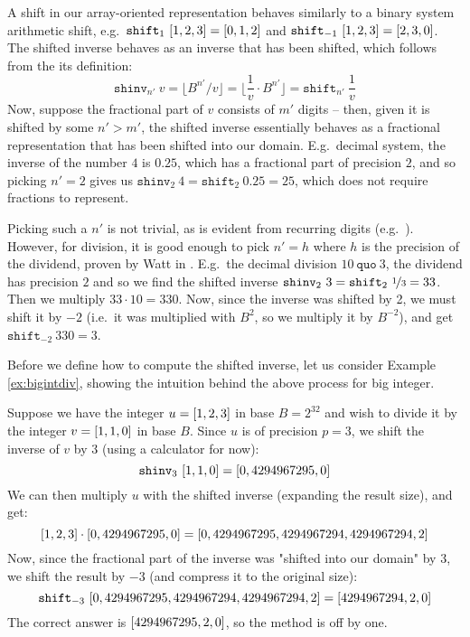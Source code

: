 A shift in our array-oriented representation behaves similarly to a binary
system arithmetic shift, e.g.\ $\mathtt{shift}_1~\mathtt{[}1,2,3\mathtt{]} = \mathtt{[}0,1,2\mathtt{]}$ and
$\mathtt{shift}_{-1}~\mathtt{[}1,2,3\mathtt{]} = \mathtt{[}2,3,0\mathtt{]}$. The shifted inverse behaves as
an inverse that has been shifted, which follows from the its definition:
\begin{equation}
\label{eq:shiftinvex}
\mathtt{shinv}_{n'}~v = \lfloor B^{n'}/ v \rfloor = \lfloor \dfrac{1}{v} \cdot B^{n'} \rfloor = \mathtt{shift}_{n'}~\dfrac{1}{v}
\end{equation}
Now, suppose the fractional part of $v$ consists of $m'$ digits -- then, given it
is shifted by some $n'>m'$, the shifted inverse essentially behaves as a
fractional representation that has been shifted into our domain. E.g.\ decimal
system, the inverse of the number $4$ is $0.25$, which has a fractional part of
precision $2$, and so picking $n'=2$ gives us
$\mathtt{shinv}_2~4 = \mathtt{shift}_2~0.25 = 25$, which does not require
fractions to represent.

Picking such a $n'$ is not trivial, as is evident from recurring digits (e.g.\
). However, for division, it is good enough to pick $n'=h$ where
$h$ is the precision of the dividend, proven by Watt in
\cite{watt2023efficient}. E.g.\ the decimal division $10~ \mathtt{quo}~3$, the
dividend has precision $2$ and so we find the shifted inverse
$\mathtt{shinv}_2~3= \mathtt{shift}_2~\nicefrac{1}{3} = 33$. Then we multiply
$33\cdot10 = 330$. Now, since the inverse was shifted by 2, we must shift it by
$-2$ (i.e.\ it was multiplied with $B^2$, so we multiply it by $B^{-2}$), and
get $\mathtt{shift}_{-2}~330 = 3$.

Before we define how to compute the shifted inverse, let us consider Example
\ref{ex:bigintdiv}, showing the intuition behind the above process for big
integer.\bigskip

\begin{example}\label{ex:bigintdiv}
  Suppose we have the integer $u=\mathtt{[}1,2,3\mathtt{]}$ in base $B=2^{32}$ and wish to
  divide it by the integer $v=\mathtt{[}1,1,0\mathtt{]}$ in base $B$. Since $u$ is of
  precision $p=3$, we shift the inverse of $v$ by $3$ (using a calculator for
  now):
\begin{equation}
\label{eq:3}
\mathtt{shinv}_3~\mathtt{[}1,1,0\mathtt{]} = \mathtt{[}0,4294967295,0\mathtt{]}
\end{equation}
We can then multiply $u$ with the shifted inverse (expanding the result size),
and get:
\begin{equation}
  \label{eq:4}
  \mathtt{[}1,2,3\mathtt{]}\cdot\mathtt{[}0,4294967295,0\mathtt{]} = \mathtt{[}0,4294967295,4294967294,4294967294,2\mathtt{]}
\end{equation}
Now, since the fractional part of the inverse was "shifted into our domain" by
3, we shift the result by $-3$ (and compress it to the original size):
\begin{equation}
  \label{eq:5}
  \mathtt{shift}_{-3}~\mathtt{[}0,4294967295,4294967294,4294967294,2\mathtt{]} = \mathtt{[}4294967294,2,0\mathtt{]}
\end{equation}
The correct answer is $\mathtt{[}4294967295,2,0\mathtt{]}$, so the method is off by one.
\end{example}\bigskip

